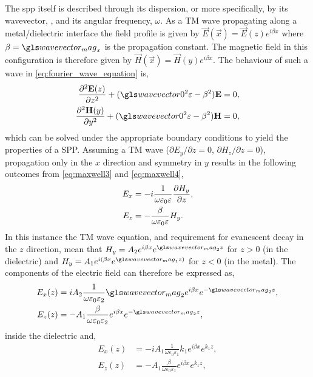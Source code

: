 \documentclass{article}
\begin{document}
The \gls{spp} itself is described through its dispersion, or more specifically, by its wavevector, \wv, and its angular frequency, $\omega$.
As a TM wave propagating along a metal/dielectric interface the field profile is given by $\vec{E}(\vec{x}) = \vec{E}(z)e^{i\beta x}$ where $\beta=\wvm_x$ is the propagation constant. The magnetic field in this configuration is therefore given by $\vec{H}(\vec{x}) = \vec{H}(y)e^{i\beta x}$. The behaviour of such a wave in \eqref{eq:fourier_wave_equation} is,
\begin{subequations}
\begin{align}
\frac{\partial^2\vec{E}(z)}{\partial z^2} + (\wvz^2\eps - \beta^2)\vec{E} &= 0,\\
\frac{\partial^2\vec{H}(y)}{\partial y^2} + (\wvz^2\eps - \beta^2)\vec{H} &= 0,
\end{align}
\end{subequations}
which can be solved under the appropriate boundary conditions to yield the properties of a SPP. Assuming a TM wave ($\partial E_y/\partial z = 0$, $\partial H_z/\partial z = 0$), propagation only in the $x$ direction and symmetry in $y$ results in the following outcomes from \eqref{eq:maxwell3} and \eqref{eq:maxwell4},
\begin{subequations}
\begin{align}
E_x &= -i\frac{1}{\omega\varepsilon_0\varepsilon}\frac{\partial H_y}{\partial z},\\
E_z &= -\frac{\beta}{\omega\varepsilon_0\varepsilon}H_y.
\end{align}
\end{subequations}
In this instance the TM wave equation, and requirement for evanescent decay in the $z$ direction, mean that $H_y = A_2e^{i\beta x}e^{\wvm_2z}$ for $z>0$ (in the dielectric) and $H_y = A_1e^{i(\beta x}e^{\wvm_1z)}$ for $z<0$ (in the metal). The components of the electric field can therefore be expressed as,
\begin{subequations}
\begin{align}
E_x(z) &= iA_2\frac{1}{\omega\epsfs\eps_2}\wvm_2e^{i\beta x}e^{-\wvm_2z},\\
E_z(z) &= -A_1\frac{\beta}{\omega\epsfs\eps_2}e^{i\beta x}e^{-\wvm_2z},
\end{align}
\end{subequations}
inside the dielectric and,
\begin{subequations}
\begin{align}
E_x(z) &= -iA_1\frac{1}{\omega\varepsilon_0\varepsilon_1}k_1e^{i\beta x}e^{k_1z},\\
E_z(z) &= -A_1\frac{\beta}{\omega\varepsilon_0\varepsilon_1}e^{i\beta x}e^{k_1z},
\end{align}
\end{subequations}
\end{document}
